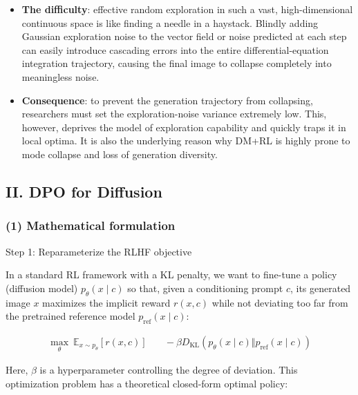 \begin{itemize}
\tightlist
\item
  \textbf{The difficulty}: effective random exploration in such a vast, high-dimensional continuous space is like finding a needle in a haystack. Blindly adding Gaussian exploration noise to the vector field or noise predicted at each step can easily introduce cascading errors into the entire differential-equation integration trajectory, causing the final image to collapse completely into meaningless noise.
\item
  \textbf{Consequence}: to prevent the generation trajectory from collapsing, researchers must set the exploration-noise variance extremely low. This, however, deprives the model of exploration capability and quickly traps it in local optima. It is also the underlying reason why DM+RL is highly prone to mode collapse and loss of generation diversity.
\end{itemize}

\hypertarget{ii.-dpo-for-diffusion}{%
\subsection{II. DPO for Diffusion}\label{ii.-dpo-for-diffusion}}

\hypertarget{mathematical-formulation}{%
\subsubsection{(1) Mathematical formulation}\label{mathematical-formulation}}

Step 1: Reparameterize the RLHF objective

In a standard RL framework with a KL penalty, we want to fine-tune a policy (diffusion model) \(p_\theta(x\mid c)\) so that, given a conditioning prompt \(c\), its generated image \(x\) maximizes the implicit reward \(r(x,c)\) while not deviating too far from the pretrained reference model \(p_{\mathrm{ref}}(x\mid c)\):

\[
\begin{aligned}
\max_\theta\ \mathbb{E}_{x\sim p_\theta}\left[r(x,c)\right]
&\quad-\beta D_{\mathrm{KL}}\left(p_\theta(x\mid c)\Vert p_{\mathrm{ref}}(x\mid c)\right)
\end{aligned}
\]

Here, \(\beta\) is a hyperparameter controlling the degree of deviation. This optimization problem has a theoretical closed-form optimal policy:

